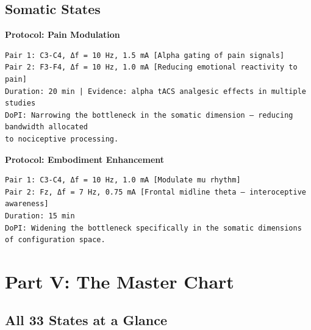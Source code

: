 \subsection*{Somatic States}


\textbf{Protocol: Pain Modulation}

\begin{verbatim}
Pair 1: C3-C4, Δf = 10 Hz, 1.5 mA [Alpha gating of pain signals]
Pair 2: F3-F4, Δf = 10 Hz, 1.0 mA [Reducing emotional reactivity to pain]
Duration: 20 min | Evidence: alpha tACS analgesic effects in multiple studies
DoPI: Narrowing the bottleneck in the somatic dimension — reducing bandwidth allocated 
to nociceptive processing.
\end{verbatim}


\textbf{Protocol: Embodiment Enhancement}

\begin{verbatim}
Pair 1: C3-C4, Δf = 10 Hz, 1.0 mA [Modulate mu rhythm]
Pair 2: Fz, Δf = 7 Hz, 0.75 mA [Frontal midline theta — interoceptive awareness]
Duration: 15 min
DoPI: Widening the bottleneck specifically in the somatic dimensions of configuration space.
\end{verbatim}


\bigskip\noindent\makebox[\textwidth]{\color{rulegray}\rule{5cm}{0.3pt}}\bigskip


\section*{Part V: The Master Chart}


\subsection*{All 33 States at a Glance}



